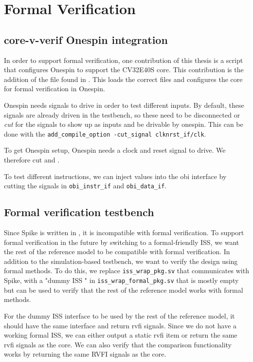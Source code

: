 \chapter{Formal Verification}
\label{ch:formal}

\section{core-v-verif Onespin integration}

In order to support formal verification, one contribution of this thesis is a script that configures Onespin \cite{onespinsolutionsgmbhUserManualOneSpin} to support the CV32E40S core. This contribution is the addition of the file  found in . This loads the correct files and configures the core for formal verification in Onespin. 

Onespin needs signals to drive in order to test different inputs. By default, these signals are already driven in the testbench, so these need to be disconnected or \textit{cut} for the signals to show up as inputs and be drivable by onespin. This can be done with the \lstinline{add_compile_option -cut_signal clknrst_if/clk}.

To get Onespin setup, Onespin needs a clock and reset signal to drive. We therefore cut  and .


To test different instructions, we can inject values into the obi interface by cutting the signals in \lstinline{obi_instr_if} and \lstinline{obi_data_if}.


\section{Formal verification testbench}

Since Spike is written in \cpp, it is incompatible with formal verification. To support formal verification in the future by switching to a formal-friendly ISS, we want the rest of the reference model to be compatible with formal verification. In addition to the simulation-based testbench, we want to verify the design using formal methods. To do this, we replace \lstinline{iss_wrap_pkg.sv} that communicates with Spike, with a "dummy ISS " in \lstinline{iss_wrap_formal_pkg.sv} that is mostly empty but can be used to verify that the rest of the reference model works with formal methods.

For the dummy ISS interface to be used by the rest of the reference model, it should have the same interface and return \acrshort{rvfi} signals. Since we do not have a working formal ISS, we can either output a static \acrshort{rvfi} item or return the same \acrshort{rvfi} signals as the core. We can also verify that the comparison functionality works by returning the same RVFI signals as the core.



